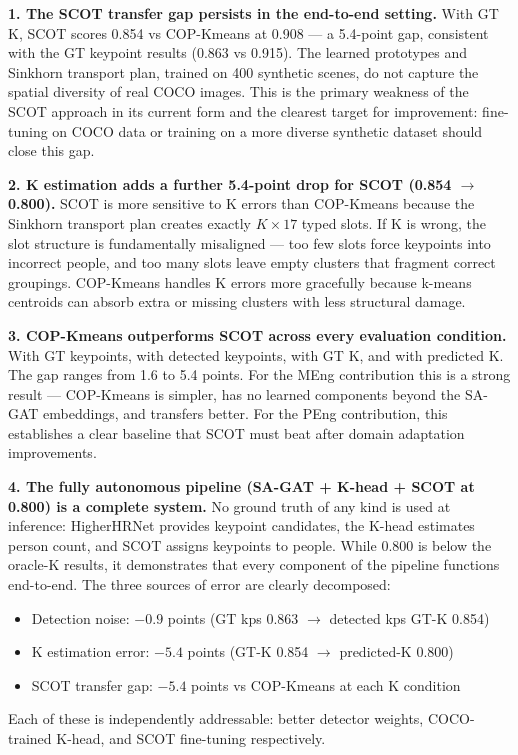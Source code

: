 \textbf{1. The SCOT transfer gap persists in the end-to-end setting.} With GT K, SCOT scores 0.854 vs COP-Kmeans at 0.908 --- a 5.4-point gap, consistent with the GT keypoint results (0.863 vs 0.915). The learned prototypes and Sinkhorn transport plan, trained on 400 synthetic scenes, do not capture the spatial diversity of real COCO images. This is the primary weakness of the SCOT approach in its current form and the clearest target for improvement: fine-tuning on COCO data or training on a more diverse synthetic dataset should close this gap.

\textbf{2. K estimation adds a further 5.4-point drop for SCOT (0.854 $\to$ 0.800).} SCOT is more sensitive to K errors than COP-Kmeans because the Sinkhorn transport plan creates exactly $K \times 17$ typed slots. If K is wrong, the slot structure is fundamentally misaligned --- too few slots force keypoints into incorrect people, and too many slots leave empty clusters that fragment correct groupings. COP-Kmeans handles K errors more gracefully because k-means centroids can absorb extra or missing clusters with less structural damage.

\textbf{3. COP-Kmeans outperforms SCOT across every evaluation condition.} With GT keypoints, with detected keypoints, with GT K, and with predicted K. The gap ranges from 1.6 to 5.4 points. For the MEng contribution this is a strong result --- COP-Kmeans is simpler, has no learned components beyond the SA-GAT embeddings, and transfers better. For the PEng contribution, this establishes a clear baseline that SCOT must beat after domain adaptation improvements.

\textbf{4. The fully autonomous pipeline (SA-GAT + K-head + SCOT at 0.800) is a complete system.} No ground truth of any kind is used at inference: HigherHRNet provides keypoint candidates, the K-head estimates person count, and SCOT assigns keypoints to people. While 0.800 is below the oracle-K results, it demonstrates that every component of the pipeline functions end-to-end. The three sources of error are clearly decomposed:
\begin{itemize}
    \item Detection noise: $-0.9$ points (GT kps 0.863 $\to$ detected kps GT-K 0.854)
    \item K estimation error: $-5.4$ points (GT-K 0.854 $\to$ predicted-K 0.800)
    \item SCOT transfer gap: $-5.4$ points vs COP-Kmeans at each K condition
\end{itemize}
Each of these is independently addressable: better detector weights, COCO-trained K-head, and SCOT fine-tuning respectively.

